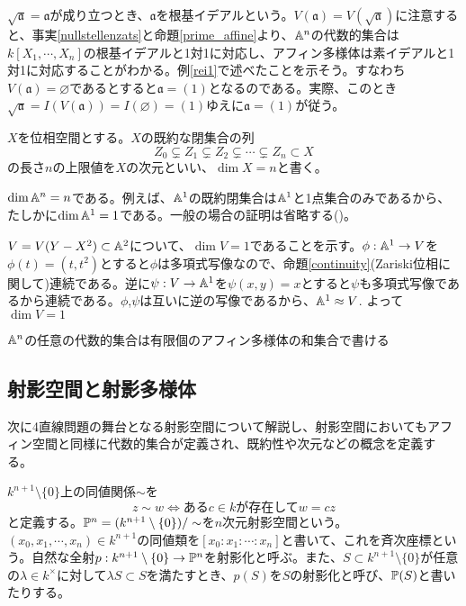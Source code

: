 \documentclass{ltjsreport}
\begin{document}
$\sqrt{\mathfrak{a}}=\mathfrak{a}$が成り立つとき、$\mathfrak{a}$を根基イデアルという。$V(\mathfrak{a})=V(\sqrt{\mathfrak{a}})$に注意すると、事実\ref{nullstellenzats}と命題\ref{prime_affine}より、$\mathbb{A}^n$の代数的集合は$k[X_1,\cdots,X_n]$の根基イデアルと1対1に対応し、アフィン多様体は素イデアルと1対1に対応することがわかる。例\ref{rei1}で述べたことを示そう。すなわち$V(\mathfrak{a})=\varnothing$であるとすると$\mathfrak{a}=(1)$となるのである。実際、このとき$\sqrt{\mathfrak{a}}=I(V(\mathfrak{a}))=I(\varnothing)=(1)$ゆえに$\mathfrak{a}=(1)$が従う。



\begin{defin}
  $X$を位相空間とする。$X$の既約な閉集合の列
  \[
  Z_0\subsetneq Z_1\subsetneq Z_2\subsetneq\cdots\subsetneq Z_n\subset X   
  \]
  の長さ$n$の上限値を$X$の次元といい、$\dim X=n$と書く。
\end{defin}

\begin{eg}
  $\dim\mathbb{A}^n=n$である。例えば、$\mathbb{A}^1$の既約閉集合は$\mathbb{A}^1$と1点集合のみであるから、たしかに$\dim\mathbb{A}^1=1$である。一般の場合の証明は省略する(\cite{RH})。
\end{eg}

\begin{eg}
  $V=V(Y-X^2)\subset\mathbb{A}^2$について、$\dim V=1$であることを示す。$\phi:\mathbb{A}^1\rightarrow V$を$\phi(t)=(t,t^2)$とすると$\phi$は多項式写像なので、命題\ref{continuity}(Zariski位相に関して)連続である。逆に$\psi:V\rightarrow \mathbb{A}^1$を$\psi(x,y)=x$とすると$\psi$も多項式写像であるから連続である。$\phi$,$\psi$は互いに逆の写像であるから、$\mathbb{A}^1\approx V$. よって$\dim V=1$
\end{eg}

\begin{fact}[\cite{RH}]\label{noether_space}
  $\mathbb{A}^n$の任意の代数的集合は有限個のアフィン多様体の和集合で書ける
\end{fact}


\subsection{射影空間と射影多様体}

次に4直線問題の舞台となる射影空間について解説し、射影空間においてもアフィン空間と同様に代数的集合が定義され、既約性や次元などの概念を定義する。

\begin{defin}
  $k^{n+1}\setminus\{0\}$上の同値関係$\sim$を
  \[
  z\sim w\Leftrightarrow \text{ある$c\in k$が存在して}w=cz  
  \]
  と定義する。$\mathbb{P}^n=(k^{n+1}\setminus\{0\})/\sim$を$n$次元射影空間という。$(x_0,x_1,\cdots,x_n)\in k^{n+1}$の同値類を$[x_0:x_1:\cdots:x_n]$と書いて、これを斉次座標という。自然な全射$p:k^{n+1}\setminus\{0\}\rightarrow \mathbb{P}^n$を射影化と呼ぶ。また、$S\subset k^{n+1}\setminus\{0\}$が任意の$\lambda\in k^\times $に対して$\lambda S\subset S$を満たすとき、$p(S)$を$S$の射影化と呼び、$\mathbb{P}(S)$と書いたりする。
\end{defin}
\end{document}

